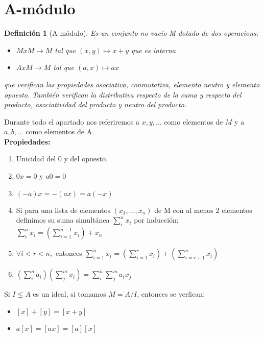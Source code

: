 \documentclass[11pt, a4paper, titlepage]{article}
\theoremstyle{theorem-style}
\theoremstyle{definition-style}
\newtheorem*{ndef}{Definición}
\theoremstyle{remark-style}
\theoremstyle{example-style}
\newenvironment{nlist}
{\begin{enumerate}
\renewcommand\labelenumi{(\emph{\roman{enumi})}}}
{\end{enumerate}}
\begin{document}
\section{A-módulo}
\begin{ndef}[A-módulo]
	Es un conjunto no vacío M dotado de dos operacions:
	\begin{itemize}
	\item $MxM \to M$ tal que $(x,y) \mapsto x+y$ que es interna
	\item $Ax M \to M$ tal que $(a,x) \mapsto ax$
\end{itemize}
que verifican las propiedades asociativa, conmutativa, elemento neutro y elemento opuesto. También verifican la distributiva respecto de la suma y respecto del producto, asociatividad del producto y neutro del producto.

\end{ndef}
Durante todo el apartado nos referiremos a $x, y,...$ como elementos de $M$ y a $a, b, ...$ como elementos de A.\\
\textbf{Propiedades:}
\begin{nlist}
	\item Unicidad del 0 y del opuesto.
	\item $0x = 0$ y $a0 = 0$
	\item $(-a)x = -(ax) = a(-x)$
	\item Si para una lista de elementos $(x_1,...,x_n)$ de M con al menos 2 elementos definimos su suma simultánea $\sum_i^n x_i$ por inducción:$ \sum_i^n x_i = (\sum_{i=1}^{n-1}x_i) +x_n$
	\item $\forall i < r < n,$ entonces $\sum_{i=1}^n x_i = (\sum_{i=1}^{r}x_i) + (\sum_{i=r+1}^{n}x_i) $
	\item $ (\sum_i^n a_i)(\sum_j^m x_i) = \sum_i^n \sum_j^m a_ix_j$
\end{nlist}

Si $I \leq A$ es un ideal, si tomamos $M= A/I$, entonces se verfican:
\begin{itemize}
	\item $[x]+[y] = [x+y]$
	\item $a[x] = [ax] = [a][x]$
\end{itemize}
\end{document}
